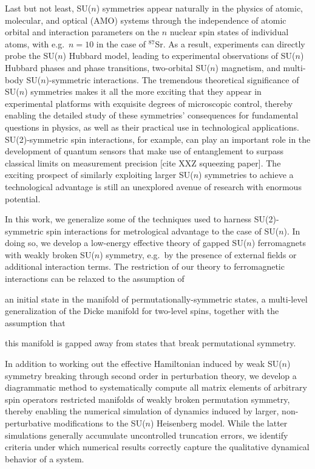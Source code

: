\documentclass[nofootinbib,notitlepage,11pt]{revtex4-2}
\newcommand{\1}{\mathds{1}}
\newcommand{\red}[1]{{\color{red} #1}}
\begin{document}
Last but not least, SU($n$) symmetries appear naturally in the physics
of atomic, molecular, and optical (AMO)
systems\cite{gorshkov2010twoorbital, beverland2016realizing,
  cazalilla2014ultracold, taie2012su, hofrichter2016direct,
  cappellini2014direct, scazza2014observation, zhang2014spectroscopic,
  goban2018emergence, perlin2019effective} through the independence of
atomic orbital and interaction parameters on the $n$ nuclear spin
states of individual atoms, with e.g.~$n=10$ in the case of
${}^{87}$Sr.  As a result, experiments can directly probe the SU($n$)
Hubbard model, leading to experimental observations of SU($n$) Hubbard
phases and phase transitions\cite{taie2012su, hofrichter2016direct},
two-orbital SU($n$) magnetism\cite{cappellini2014direct,
  scazza2014observation, zhang2014spectroscopic}, and multi-body
SU($n$)-symmetric interactions\cite{goban2018emergence,
  perlin2019effective}.  The tremendous theoretical significance of
SU($n$) symmetries makes it all the more exciting that they appear in
experimental platforms with exquisite degrees of microscopic control,
thereby enabling the detailed study of these symmetries' consequences
for fundamental questions in physics, as well as their practical use
in technological applications.  SU(2)-symmetric spin interactions, for
example, can play an important role in the development of quantum
sensors that make use of entanglement to surpass classical limits on
measurement precision\cite{he2019engineering}\red{[cite XXZ squeezing
  paper]}.  The exciting prospect of similarly exploiting larger
SU($n$) symmetries to achieve a technological advantage is still an
unexplored avenue of research with enormous potential.

In this work, we generalize some of the techniques used to harness
SU(2)-symmetric spin interactions for metrological advantage to the
case of SU($n$).  In doing so, we develop a low-energy effective
theory of gapped SU($n$) ferromagnets with weakly broken SU($n$)
symmetry, e.g.~by the presence of external fields or additional
interaction terms.  The restriction of our theory to ferromagnetic
interactions can be relaxed to the assumption of
\begin{enumerate*}
\item an initial state in the manifold of permutationally-symmetric
  states, a multi-level generalization of the Dicke manifold for
  two-level spins, together with the assumption that
\item this manifold is gapped away from states that break
  permutational symmetry.
\end{enumerate*}
In addition to working out the effective Hamiltonian induced by weak
SU($n$) symmetry breaking through second order in perturbation theory,
we develop a diagrammatic method to systematically compute all matrix
elements of arbitrary spin operators restricted manifolds of weakly
broken permutation symmetry, thereby enabling the numerical simulation
of dynamics induced by larger, non-perturbative modifications to the
SU($n$) Heisenberg model.  While the latter simulations generally
accumulate uncontrolled truncation errors, we identify criteria under
which numerical results correctly capture the qualitative dynamical
behavior of a system.
\end{document}
